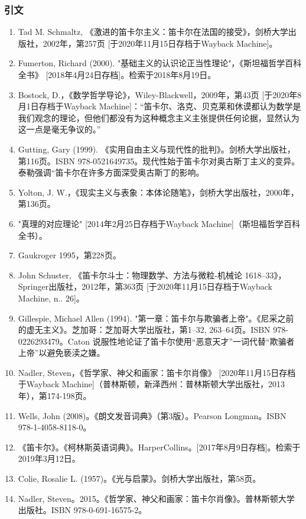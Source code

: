 \subsubsection{引文}  
\begin{enumerate}
\item Tad M. Schmaltz, 《激进的笛卡尔主义：笛卡尔在法国的接受》，剑桥大学出版社，2002年，第257页 [于2020年11月15日存档于Wayback Machine]。  
\item Fumerton, Richard (2000). "基础主义的认识论正当性理论"，《斯坦福哲学百科全书》 [2018年4月24日存档]。检索于2018年8月19日。  
\item Bostock, D.，《数学哲学导论》，Wiley-Blackwell，2009年，第43页 [于2020年8月1日存档于Wayback Machine]：“笛卡尔、洛克、贝克莱和休谟都认为数学是我们观念的理论，但他们都没有为这种概念主义主张提供任何论据，显然认为这一点是毫无争议的。”  
\item Gutting, Gary (1999). 《实用自由主义与现代性的批判》。剑桥大学出版社，第116页。ISBN 978-0521649735。现代性始于笛卡尔对奥古斯丁主义的变异。泰勒强调“笛卡尔在许多方面深受奥古斯丁的影响。
\item Yolton, J. W.，《现实主义与表象：本体论随笔》，剑桥大学出版社，2000年，第136页。  
\item "真理的对应理论" [2014年2月25日存档于Wayback Machine]（斯坦福哲学百科全书）。  
\item Gaukroger 1995，第228页。  
\item  John Schuster, 《笛卡尔斗士：物理数学、方法与微粒-机械论 1618–33》，Springer出版社，2012年，第363页 [于2020年11月15日存档于Wayback Machine, n.. 26]。  
\item Gillespie, Michael Allen (1994). "第一章：笛卡尔与欺骗者上帝"。《尼采之前的虚无主义》。芝加哥：芝加哥大学出版社，第1–32, 263–64页。ISBN 978-0226293479。Caton 说服性地论证了笛卡尔使用“恶意天才”一词代替“欺骗者上帝”以避免亵渎之嫌。
\item Nadler, Steven，《哲学家、神父和画家：笛卡尔肖像》 [2020年11月15日存档于Wayback Machine]（普林斯顿，新泽西州：普林斯顿大学出版社，2013年），第174-198页。  
\item Wells, John (2008)。《朗文发音词典》（第3版）。Pearson Longman。ISBN 978-1-4058-8118-0。  
\item 《笛卡尔》。《柯林斯英语词典》。HarperCollins。[2017年8月9日存档]。检索于2019年3月12日。  
\item Colie, Rosalie L. (1957)。《光与启蒙》。剑桥大学出版社，第58页。  
\item Nadler, Steven。2015。《哲学家、神父和画家：笛卡尔肖像》。普林斯顿大学出版社。ISBN 978-0-691-16575-2。

\end{enumerate}
